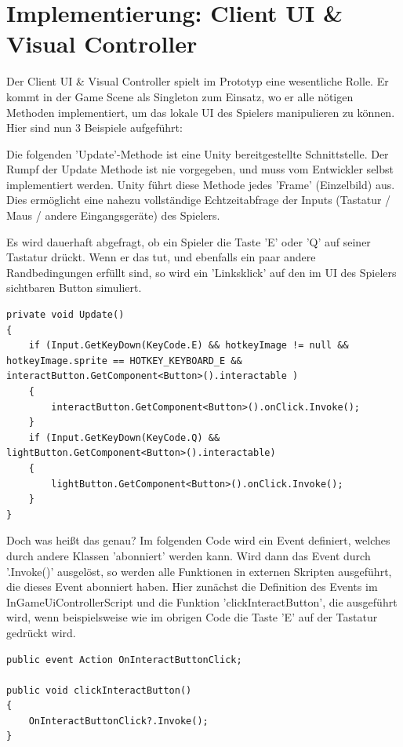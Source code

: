 \section{Implementierung: Client UI \& Visual Controller}
\label{implementierung:client_UI_Controller}

Der Client UI \& Visual Controller spielt im Prototyp eine wesentliche Rolle. Er kommt in der Game Scene als Singleton \cite{M.Gatrell.2009} zum Einsatz, wo er alle nötigen Methoden implementiert, um das lokale UI des Spielers manipulieren zu können. Hier sind nun 3 Beispiele aufgeführt:

Die folgenden 'Update'-Methode ist eine Unity bereitgestellte Schnittstelle. Der Rumpf der Update Methode ist nie vorgegeben, und muss vom Entwickler selbst implementiert werden. Unity führt diese Methode jedes 'Frame' (Einzelbild) \cite{Wikipedia.2021j} aus. Dies ermöglicht eine nahezu vollständige Echtzeitabfrage der Inputs (Tastatur / Maus / andere Eingangsgeräte) des Spielers.

Es wird dauerhaft abgefragt, ob ein Spieler die Taste 'E' oder 'Q' auf seiner Tastatur drückt. Wenn er das tut, und ebenfalls ein paar andere Randbedingungen erfüllt sind, so wird ein 'Linksklick' auf den im UI des Spielers sichtbaren Button simuliert.

\begin{lstlisting}[caption= InGameUiControllerScript.cs Update Method]
private void Update()
{
	if (Input.GetKeyDown(KeyCode.E) && hotkeyImage != null && hotkeyImage.sprite == HOTKEY_KEYBOARD_E && interactButton.GetComponent<Button>().interactable )
	{
		interactButton.GetComponent<Button>().onClick.Invoke();
	}
	if (Input.GetKeyDown(KeyCode.Q) && lightButton.GetComponent<Button>().interactable)
	{
		lightButton.GetComponent<Button>().onClick.Invoke();
	}
}
\end{lstlisting}

Doch was heißt das genau? Im folgenden Code wird ein Event definiert, welches durch andere Klassen 'abonniert' werden kann. Wird dann das Event durch '.Invoke()' ausgelöst, so werden alle Funktionen in externen Skripten ausgeführt, die dieses Event abonniert haben. Hier zunächst die Definition des Events im InGameUiControllerScript und die Funktion 'clickInteractButton', die ausgeführt wird, wenn beispielsweise wie im obrigen Code die Taste 'E' auf der Tastatur gedrückt wird.

\begin{lstlisting}[caption= InGameUiControllerScript.cs OnInteractButtonClick Event]
public event Action OnInteractButtonClick;	

public void clickInteractButton()
{
	OnInteractButtonClick?.Invoke();
}
\end{lstlisting}

